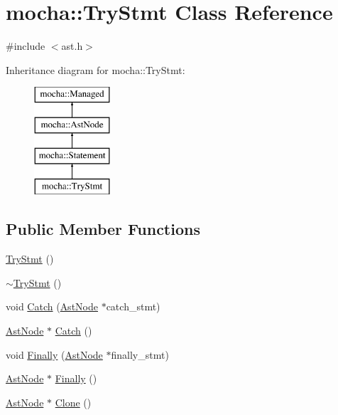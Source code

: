 \hypertarget{classmocha_1_1_try_stmt}{
\section{mocha::TryStmt Class Reference}
\label{classmocha_1_1_try_stmt}
}


{\ttfamily \#include $<$ast.h$>$}

Inheritance diagram for mocha::TryStmt:\begin{figure}[H]
\begin{center}
\leavevmode
\includegraphics[height=4.000000cm]{classmocha_1_1_try_stmt}
\end{center}
\end{figure}
\subsection*{Public Member Functions}
\begin{DoxyCompactItemize}
\item 
\hyperlink{classmocha_1_1_try_stmt_acb14b494a20728a2712d1bc1e02f5310}{TryStmt} ()
\item 
\hyperlink{classmocha_1_1_try_stmt_aa97e290ad61c86e02db707b30280002a}{$\sim$TryStmt} ()
\item 
void \hyperlink{classmocha_1_1_try_stmt_a3e3a534542041937a1130a01a4b48252}{Catch} (\hyperlink{classmocha_1_1_ast_node}{AstNode} $\ast$catch\_\-stmt)
\item 
\hyperlink{classmocha_1_1_ast_node}{AstNode} $\ast$ \hyperlink{classmocha_1_1_try_stmt_a076b91689cf9ca61ee79441d806355f9}{Catch} ()
\item 
void \hyperlink{classmocha_1_1_try_stmt_afba58442be320f17d845c1b4f109f6bf}{Finally} (\hyperlink{classmocha_1_1_ast_node}{AstNode} $\ast$finally\_\-stmt)
\item 
\hyperlink{classmocha_1_1_ast_node}{AstNode} $\ast$ \hyperlink{classmocha_1_1_try_stmt_ab12e9089d50666926e30fc0f4ac0e253}{Finally} ()
\item 
\hyperlink{classmocha_1_1_ast_node}{AstNode} $\ast$ \hyperlink{classmocha_1_1_try_stmt_a8dc69911100fc7cb73b7383283c96571}{Clone} ()
\end{DoxyCompactItemize}
